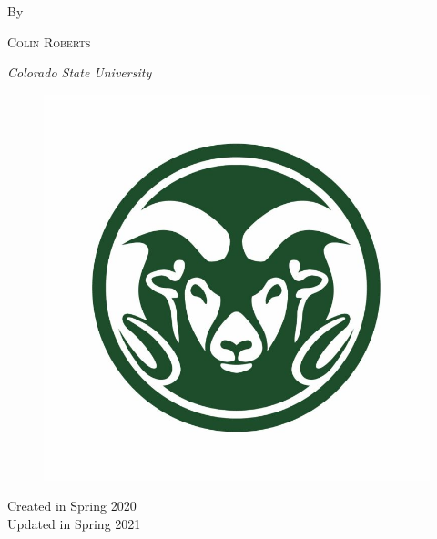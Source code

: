 \begin{titlepage}
	By
	
	\vspace{0.5\baselineskip} %
	
	{\scshape\Large Colin Roberts \\} %
	
	\vspace{0.5\baselineskip} %
	
	\textit{Colorado State University} %
	
	\vfill %
	
	
	\begin{figure}[H]
	    \centering
	    \includegraphics[width=.8\textwidth]{Frontmatter/ram_logo.jpg}
	\end{figure}
	
	\vspace{0.3\baselineskip} %
	
	Created in Spring 2020\\
    Updated in Spring 2021 %
	

\end{titlepage}